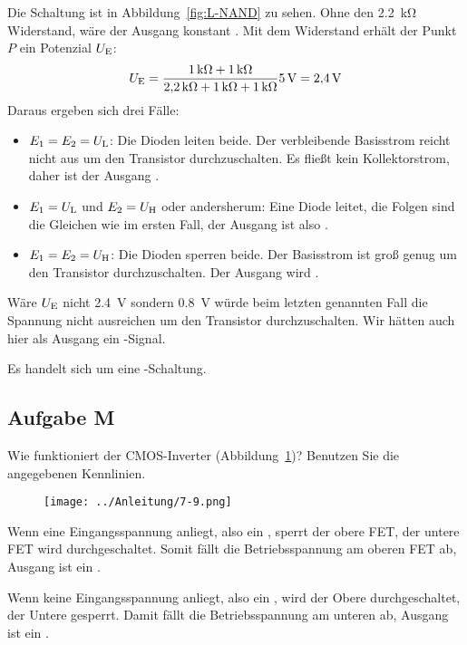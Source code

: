 Die Schaltung ist in Abbildung~\ref{fig:L-NAND} zu sehen. Ohne den
\SI{2.2}{\kilo\ohm} Widerstand, wäre der Ausgang konstant \thigh. Mit dem
Widerstand erhält der Punkt $P$ ein Potenzial $\UE$:
\[
    \UE = \frac {\SI{1}{\kilo\ohm} + \SI{1}{\kilo\ohm}} {\SI{2.2}{\kilo\ohm} +
    \SI{1}{\kilo\ohm} + \SI{1}{\kilo\ohm}}\SI 5{\volt} = \SI{2.4}{\volt}
\]
Daraus ergeben sich drei Fälle:
\begin{itemize}
    \item
        $E_1 = E_2 = \UL$: Die Dioden leiten beide. Der verbleibende Basisstrom
        reicht nicht aus um den Transistor durchzuschalten. Es fließt kein
        Kollektorstrom, daher ist der Ausgang \thigh.
    \item
        $E_1 = \UL$ und $E_2 = \UH$ oder andersherum: Eine Diode leitet, die
        Folgen sind die Gleichen wie im ersten Fall, der Ausgang ist also
        \thigh.
    \item
        $E_1 = E_2 = \UH$: Die Dioden sperren beide. Der Basisstrom ist groß
        genug um den Transistor durchzuschalten. Der Ausgang wird \tlow.
\end{itemize}
Wäre $\UE$ nicht \SI{2.4}{\volt} sondern \SI{0.8}{\volt} würde beim letzten
genannten Fall die Spannung nicht ausreichen um den Transistor durchzuschalten.
Wir hätten auch hier als Ausgang ein \thigh-Signal.

Es handelt sich um eine \tnand-Schaltung.

\FloatBarrier
\subsection{Aufgabe M}

\begin{problem}
	Wie funktioniert der CMOS-Inverter (Abbildung~\ref{fig:7-9})? Benutzen Sie
	die angegebenen Kennlinien.
\end{problem}

\begin{figure}[htbp]
	\centering
	\texttt{[image: ../Anleitung/7-9.png]}
	\caption{%
		\cite[Abbildung~7.9]{physik313-Anleitung}
	}
	\label{fig:7-9}
\end{figure}

Wenn eine Eingangsspannung anliegt, also ein \thigh, sperrt der obere FET, der
untere FET wird durchgeschaltet. Somit fällt die Betriebsspannung am oberen FET
ab, Ausgang ist ein \tlow.

Wenn keine Eingangsspannung anliegt, also ein \tlow, wird der Obere
durchgeschaltet, der Untere gesperrt. Damit fällt die Betriebsspannung am
unteren ab, Ausgang ist ein \thigh.

